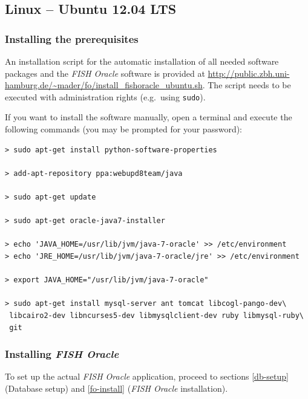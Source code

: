 \documentclass[11pt,final]{article}
\newcommand{\FO}[0]{\emph{FISH Oracle}\xspace}
\begin{document}
\subsection{Linux -- Ubuntu 12.04 LTS}
\label{ubuntu}

\subsubsection*{Installing the prerequisites}

An installation script for the automatic installation of all needed software
packages and the \FO software is provided at
\url{http://public.zbh.uni-hamburg.de/~mader/fo/install_fishoracle_ubuntu.sh}.
The script needs to be executed with administration rights (e.g.\ using
\texttt{sudo}).

If you want to install the software manually, open a terminal
and execute the following commands (you may be prompted for your password):

\begin{lstlisting}
> sudo apt-get install python-software-properties

> add-apt-repository ppa:webupd8team/java

> sudo apt-get update

> sudo apt-get oracle-java7-installer

> echo 'JAVA_HOME=/usr/lib/jvm/java-7-oracle' >> /etc/environment
> echo 'JRE_HOME=/usr/lib/jvm/java-7-oracle/jre' >> /etc/environment

> export JAVA_HOME="/usr/lib/jvm/java-7-oracle"

> sudo apt-get install mysql-server ant tomcat libcogl-pango-dev\
 libcairo2-dev libncurses5-dev libmysqlclient-dev ruby libmysql-ruby\
 git
\end{lstlisting}

\subsubsection*{Installing \FO}

To set up the actual \FO application, proceed to sections \ref{db-setup}
(Database setup) and \ref{fo-install} (\FO installation).
\end{document}
